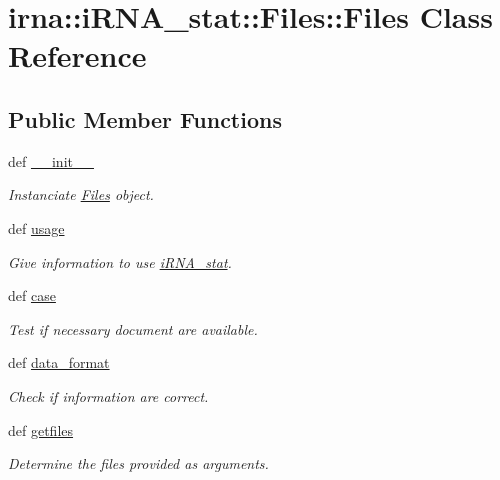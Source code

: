 \hypertarget{classirna_1_1iRNA__stat_1_1Files_1_1Files}{
\section{irna\-:\-:i\-R\-N\-A\-\_\-stat\-:\-:\-Files\-:\-:\-Files \-Class \-Reference}
\label{classirna_1_1iRNA__stat_1_1Files_1_1Files}
}
\subsection*{\-Public \-Member \-Functions}
\begin{DoxyCompactItemize}
\item 
def \hyperlink{classirna_1_1iRNA__stat_1_1Files_1_1Files_a3cca9bbee540a4f057abd7486f674a8c}{\-\_\-\-\_\-init\-\_\-\-\_\-}
\begin{DoxyCompactList}\small\item\em \-Instanciate \hyperlink{classirna_1_1iRNA__stat_1_1Files_1_1Files}{\-Files} object. \end{DoxyCompactList}\item 
def \hyperlink{classirna_1_1iRNA__stat_1_1Files_1_1Files_abec953836e3d6a7405b8353f105814a5}{usage}
\begin{DoxyCompactList}\small\item\em \-Give information to use \hyperlink{namespaceirna_1_1iRNA__stat_1_1iRNA__stat}{i\-R\-N\-A\-\_\-stat}. \end{DoxyCompactList}\item 
def \hyperlink{classirna_1_1iRNA__stat_1_1Files_1_1Files_a9b11ede005e03b13eee7817a0f4c4e87}{case}
\begin{DoxyCompactList}\small\item\em \-Test if necessary document are available. \end{DoxyCompactList}\item 
def \hyperlink{classirna_1_1iRNA__stat_1_1Files_1_1Files_a9d2964061bd4e8adc63ac704e933e3fb}{data\-\_\-format}
\begin{DoxyCompactList}\small\item\em \-Check if information are correct. \end{DoxyCompactList}\item 
def \hyperlink{classirna_1_1iRNA__stat_1_1Files_1_1Files_a8ed0e878f400d4d537e8294a8554934c}{getfiles}
\begin{DoxyCompactList}\small\item\em \-Determine the files provided as arguments. \end{DoxyCompactList}\end{DoxyCompactItemize}
